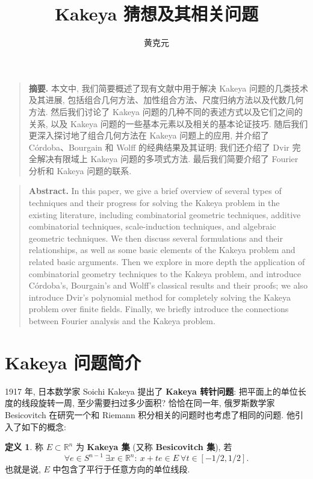 \documentclass[a4paper]{ctexart}
\numberwithin{equation}{section}
\numberwithin{figure}{section}
\numberwithin{table}{section}
\theoremstyle{definition}
\newtheorem*{definition}{\indent 定义}
\newcommand{\R}{\mathbb{R}}
\begin{document}
\title{Kakeya 猜想及其相关问题}
\author{黄克元}
\date{}
\maketitle

\begin{quote}
    \textbf{摘要.} 本文中, 我们简要概述了现有文献中用于解决 Kakeya 问题的几类技术及其进展, 包括组合几何方法、加性组合方法、尺度归纳方法以及代数几何方法. 然后我们讨论了 Kakeya 问题的几种不同的表述方式以及它们之间的关系, 以及 Kakeya 问题的一些基本元素以及相关的基本论证技巧. 随后我们更深入探讨地了组合几何方法在 Kakeya 问题上的应用, 并介绍了 C\'ordoba、Bourgain 和 Wolff 的经典结果及其证明; 我们还介绍了 Dvir 完全解决有限域上 Kakeya 问题的多项式方法. 最后我们简要介绍了 Fourier 分析和 Kakeya 问题的联系.
\end{quote}

\begin{quote}
    \textbf{Abstract.} In this paper, we give a brief overview of several types of techniques and their progress for solving the Kakeya problem in the existing literature, including combinatorial geometric techniques, additive combinatorial techniques, scale-induction techniques, and algebraic geometric techniques. We then discuss several formulations and their relationships, as well as some basic elements of the Kakeya problem and related basic arguments. Then we explore in more depth the application of combinatorial geometry techniques to the Kakeya problem, and introduce C\'ordoba's, Bourgain's and Wolff's classical results and their proofs; we also introduce Dvir's polynomial method for completely solving the Kakeya problem over finite fields. Finally, we briefly introduce the connections between Fourier analysis and the Kakeya problem.
\end{quote}

\section{Kakeya 问题简介}

1917 年, 日本数学家 Soichi Kakeya 提出了 \textbf{Kakeya 转针问题}: 把平面上的单位长度的线段旋转一周, 至少需要扫过多少面积? 恰恰在同一年, 俄罗斯数学家 Besicovitch 在研究一个和 Riemann 积分相关的问题时也考虑了相同的问题. 他引入了如下的概念:

\begin{definition}
    称 $E\subset\R^n$ 为 \textbf{Kakeya 集} (又称 \textbf{Besicovitch 集}), 若 
    \begin{equation*}
        \forall e\in S^{n-1}\ \exists x\in\R^n:\ x+te\in E\ \forall t\in [-1/2, 1/2].
    \end{equation*}
    也就是说, $E$ 中包含了平行于任意方向的单位线段.
\end{definition}
\end{document}
